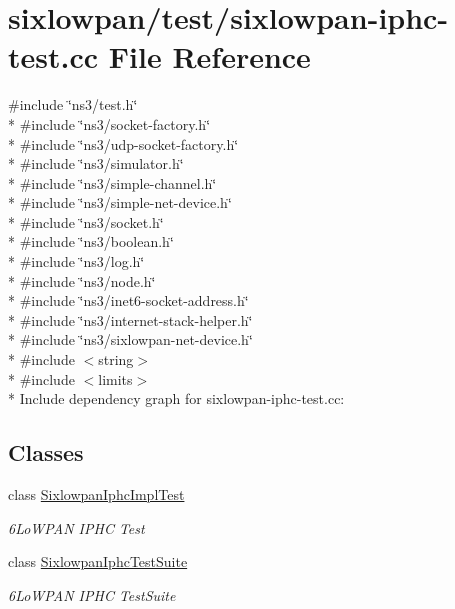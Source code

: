 \hypertarget{sixlowpan-iphc-test_8cc}{}\section{sixlowpan/test/sixlowpan-\/iphc-\/test.cc File Reference}
\label{sixlowpan-iphc-test_8cc}
{\ttfamily \#include \char`\"{}ns3/test.\+h\char`\"{}}\\*
{\ttfamily \#include \char`\"{}ns3/socket-\/factory.\+h\char`\"{}}\\*
{\ttfamily \#include \char`\"{}ns3/udp-\/socket-\/factory.\+h\char`\"{}}\\*
{\ttfamily \#include \char`\"{}ns3/simulator.\+h\char`\"{}}\\*
{\ttfamily \#include \char`\"{}ns3/simple-\/channel.\+h\char`\"{}}\\*
{\ttfamily \#include \char`\"{}ns3/simple-\/net-\/device.\+h\char`\"{}}\\*
{\ttfamily \#include \char`\"{}ns3/socket.\+h\char`\"{}}\\*
{\ttfamily \#include \char`\"{}ns3/boolean.\+h\char`\"{}}\\*
{\ttfamily \#include \char`\"{}ns3/log.\+h\char`\"{}}\\*
{\ttfamily \#include \char`\"{}ns3/node.\+h\char`\"{}}\\*
{\ttfamily \#include \char`\"{}ns3/inet6-\/socket-\/address.\+h\char`\"{}}\\*
{\ttfamily \#include \char`\"{}ns3/internet-\/stack-\/helper.\+h\char`\"{}}\\*
{\ttfamily \#include \char`\"{}ns3/sixlowpan-\/net-\/device.\+h\char`\"{}}\\*
{\ttfamily \#include $<$string$>$}\\*
{\ttfamily \#include $<$limits$>$}\\*
Include dependency graph for sixlowpan-\/iphc-\/test.cc\+:
\subsection*{Classes}
\begin{DoxyCompactItemize}
\item 
class \hyperlink{classSixlowpanIphcImplTest}{Sixlowpan\+Iphc\+Impl\+Test}
\begin{DoxyCompactList}\small\item\em 6\+Lo\+W\+P\+AN I\+P\+HC Test \end{DoxyCompactList}\item 
class \hyperlink{classSixlowpanIphcTestSuite}{Sixlowpan\+Iphc\+Test\+Suite}
\begin{DoxyCompactList}\small\item\em 6\+Lo\+W\+P\+AN I\+P\+HC Test\+Suite \end{DoxyCompactList}\end{DoxyCompactItemize}
